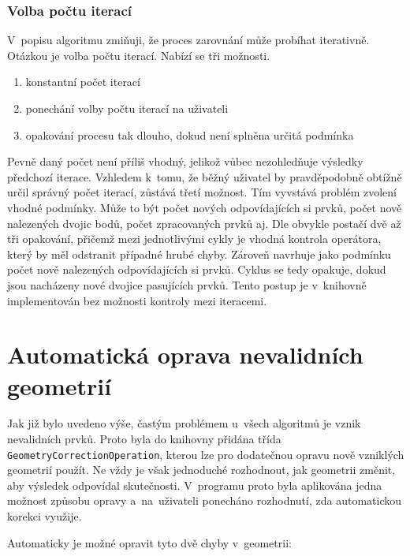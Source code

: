 \subsubsection{Volba počtu iterací}

V~popisu algoritmu zmiňuji, že proces zarovnání může probíhat iterativně.
Otázkou je volba počtu iterací. Nabízí se tři možnosti.
\begin{enumerate}
 \item konstantní počet iterací
 \item ponechání volby počtu iterací na uživateli
 \item opakování procesu tak dlouho, dokud není splněna určitá podmínka
\end{enumerate}
Pevně daný počet není příliš vhodný, jelikož vůbec nezohledňuje výsledky
předchozí iterace. Vzhledem k~tomu, že běžný uživatel by pravděpodobně
obtížně určil správný počet iterací, zůstává třetí možnost. Tím vyvstává
problém zvolení vhodné podmínky. Může to být počet nových odpovídajících 
si prvků, počet nově nalezených dvojic bodů, počet zpracovaných prvků aj.
Dle \cite{saalfeld}  obvykle postačí dvě až tři opakování,
přičemž mezi jednotlivými cykly je vhodná kontrola operátora,
který by měl odstranit případné hrubé chyby. Zároveň navrhuje jako podmínku
počet nově nalezených odpovídajících si prvků. Cyklus se tedy opakuje,
dokud jsou nacházeny nové dvojice pasujících prvků. Tento postup je 
v~knihovně  implementován bez možnosti kontroly mezi iteracemi. 


\section{Automatická oprava nevalidních geometrií}
\label{problemy-opravy}

Jak již bylo uvedeno výše, častým problémem u~všech algoritmů je vznik
nevalidních prvků. Proto byla do knihovny  přidána třída
\texttt{Geometry\-Correction\-Operation}, kterou lze pro dodatečnou 
opravu nově vzniklých geometrií použít. Ne vždy je však jednoduché 
rozhodnout, jak geometrii změnit, aby výsledek odpovídal skutečnosti. 
V~programu proto byla aplikována jedna možnost způsobu opravy 
a~na~uživateli ponecháno rozhodnutí, zda automatickou korekci využije.

Automaticky je možné opravit tyto dvě chyby v~geometrii:

